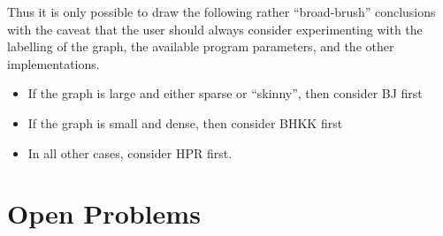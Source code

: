 
Thus it is only possible to draw the following rather ``broad-brush'' conclusions with the caveat that the user should always consider experimenting with the labelling of the graph, the available program parameters, and the other implementations.
\begin{itemize}
\setlength{\itemsep}{0pt}
\item If the graph is large and either sparse or ``skinny'', then consider BJ first
\item If the graph is small and dense, then consider BHKK first
\item In all other cases, consider HPR first.
\end{itemize}



\section{Open Problems}





